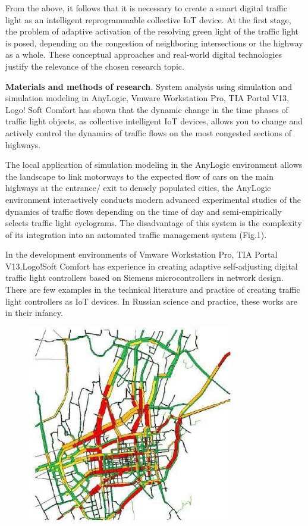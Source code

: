 From the above, it follows that it is necessary to create a smart
digital traffic light as an intelligent reprogrammable collective IoT
device. At the first stage, the problem of adaptive activation of the
resolving green light of the traffic light is posed, depending on the
congestion of neighboring intersections or the highway as a whole. These
conceptual approaches and real-world digital technologies justify the
relevance of the chosen research topic.

\textbf{Materials and methods of research}\emph{.} System analysis using
simulation and simulation modeling in AnyLogic, Vmware Workstation Pro,
TIA Portal V13, Logo! Soft Comfort has shown that the dynamic change in
the time phases of traffic light objects, as collective intelligent IoT
devices, allows you to change and actively control the dynamics of
traffic flows on the most congested sections of highways.

The local application of simulation modeling in the AnyLogic environment
allows the landscape to link motorways to the expected flow of cars on
the main highways at the entrance/ exit to densely populated cities, the
AnyLogic environment interactively conducts modern advanced experimental
studies of the dynamics of traffic flows depending on the time of day
and semi-empirically selects traffic light cyclograms. The disadvantage
of this system is the complexity of its integration into an automated
traffic management system (Fig.1).

In the development environments of Vmware Workstation Pro, TIA Portal
V13,Logo!Soft Comfort has experience in creating adaptive self-adjusting
digital traffic light controllers based on Siemens microcontrollers in
network design. There are few examples in the technical literature and
practice of creating traffic light controllers as IoT devices. In
Russian science and practice, these works are in their infancy.

\begin{figure}[H]
	\centering
	\includegraphics[width=0.8\textwidth]{assets/73}
	\caption*{}
\end{figure}

